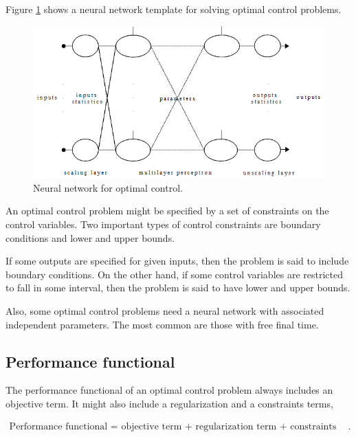 Figure \ref{NeuralNetworkOptimalControlFigure} shows a neural network template for solving optimal control problems. 

\begin{figure}[h!]
\begin{center}
\includegraphics[width=1.2\textwidth]{optimal_control/neural_network_optimal_control.png}
\caption{Neural network for optimal control.}\label{NeuralNetworkOptimalControlFigure}
\end{center}
\end{figure}

An optimal control problem might be specified by a set of constraints on the control variables. 
Two important types of control constraints are boundary conditions and lower and upper bounds. 

If some outputs are specified for given
inputs, then the problem is said to include boundary
conditions. On the other hand, if some
control variables are restricted to fall in some interval, then the
problem is said to have lower and upper bounds.

Also, some optimal control problems need a neural network with associated independent parameters. 
The most common are those with free final time.

\subsection*{Performance functional}

The performance functional of an optimal control problem always includes an objective term.
It might also include a regularization and a constraints terms,  

\begin{eqnarray}\nonumber
\text{Performance functional = objective term + regularization term + constraints term}. 
\end{eqnarray}

